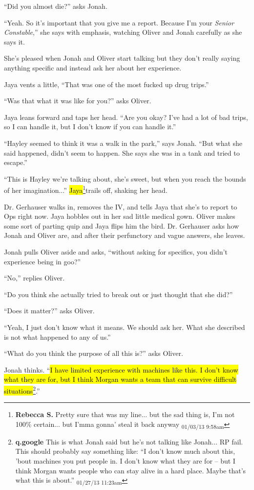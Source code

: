 ``Did you almost die?'' asks Jonah.

``Yeah.  So it's important that you give me a report.  Because I'm your \textit{Senior Constable},'' she says with emphasis, watching Oliver and Jonah carefully as she says it.

She's pleased when Jonah and Oliver start talking but they don't really saying anything specific and instead ask her about her experience. 

Jaya vents a little, ``That was one of the most fucked up drug trips.''

``Was that what it was like for you?'' asks Oliver.

Jaya leans forward and taps her head.  ``Are you okay?  I've had a lot of bad trips, so I can handle it, but I don't know if you can handle it.''

``Hayley seemed to think it was a walk in the park,'' says Jonah. ``But what she said happened, didn't seem to happen.  She says she was in a tank and tried to escape.''

``This is Hayley we're talking about, she's sweet, but when you reach the bounds of her imagination...'' \hl{Jaya}\footnote{\textbf{Rebecca S. }Pretty sure that was my line... but the sad thing is, I'm not 100\% certain... but I'mma gonna' steal it back anyway \textsubscript{01/03/13 9:58am}}trails off, shaking her head.



Dr. Gerhauser walks in, removes the IV, and tells Jaya that she's to report to Ops right now.  Jaya hobbles out in her sad little medical gown.  Oliver makes some sort of parting quip and Jaya flips him the bird.  Dr. Gerhauser asks how Jonah and Oliver are, and after their perfunctory and vague answers, she leaves. 



Jonah pulls Oliver aside and asks, ``without asking for specifics, you didn't experience being in goo?''

``No,'' replies Oliver.

``Do you think she actually tried to break out or just thought that she did?''

``Does it matter?'' asks Oliver.

``Yeah, I just don't know what it means.  We should ask her.  What she described is not what happened to any of us.''

``What do you think the purpose of all this is?'' asks Oliver.

Jonah thinks.  ``\hl{I have limited experience with machines like this.  I don't know what they are for, but I think Morgan wants a team that can survive difficult situations}\footnote{\textbf{q.google }This is what Jonah said but he's not talking like Jonah... RP fail.  This should probably say something like: ``I don't know much about this, 'bout machines you put people in.  I don't know what they are for -- but I think Morgan wants people who can stay alive in a hard place.  Maybe that's what this is about.'' \textsubscript{01/27/13 11:23am}}.''

